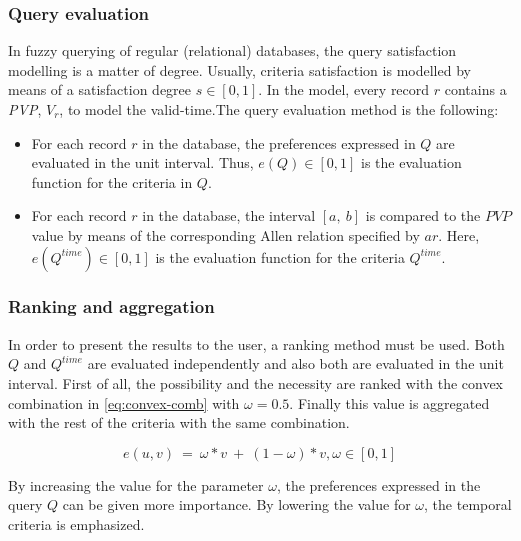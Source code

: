 \subsubsection{Query evaluation}
In fuzzy querying of regular (relational) databases, the query satisfaction modelling is a matter of degree. Usually, criteria satisfaction is modelled by means of a satisfaction degree $s \in \left[ 0, 1\right]$. In the model, every record $r$ contains a \emph{PVP}, $V_r$, to model the valid-time.The query evaluation method is the following:
\begin{itemize}
\item
For each record $r$ in the database, the preferences expressed in $Q$ are evaluated in the unit interval. Thus, $e(Q) \in \left[0, 1\right]$ is the evaluation function for the criteria in $Q$.
\item
For each record $r$ in the database, the interval $ \left[a, \ b \right]$ is compared to the $PVP$ value by means of the corresponding Allen relation specified by $ar$. Here, $e(Q^{time}) \in \left[0, 1 \right]$ is the evaluation function for the criteria $Q^{time}$.
\end{itemize}


\subsubsection{Ranking and aggregation}
In order to present the results to the user, a ranking method must be used. Both $Q$ and $Q^{time}$ are evaluated independently and also both are evaluated in the unit interval.
First of all, the possibility and the necessity are ranked with the convex combination in \eqref{eq:convex-comb} with $\omega=0.5$. Finally this value is aggregated with the rest of the criteria with the same combination. %

\begin{equation}
\label{eq:convex-comb}
e(u,v)\ =\ \omega*v\ +\ (1-\omega)*v, \omega \in \left[0, 1 \right]
\end{equation}

 By increasing the value for the parameter $\omega$, the preferences expressed in the query $Q$ can be given more importance. By lowering the value for $\omega$, the temporal criteria is emphasized.


